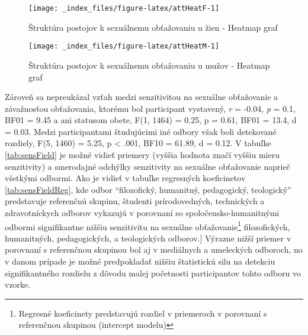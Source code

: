 \documentclass[
]{article}
\begin{document}
\begin{figure}

{\centering \texttt{[image: \_index\_files/figure-latex/attHeatF-1]} 

}

\caption{Štruktúra postojov k sexuálnemu obťažovaniu u žien - Heatmap graf}\label{fig:attHeatF}
\end{figure}

\begin{figure}

{\centering \texttt{[image: \_index\_files/figure-latex/attHeatM-1]} 

}

\caption{Štruktúra postojov k sexuálnemu obťažovaniu u mužov - Heatmap graf}\label{fig:attHeatM}
\end{figure}

Zároveň sa nepreukázal vzťah medzi senzitivitou na sexuálne obťažovanie a závažnosťou obťažovania, ktorému bol participant vystavený, \emph{r} = -0.04, \emph{p} = 0.1, BF01 = 9.45 a ani statusom obete, F(1, 1464) = 0.25, p = 0.61, BF01 = 13.4, d = 0.03. Medzi participantami študujúcimi iné odbory však boli detekované rozdiely, F(5, 1460) = 5.25, p \textless{} .001, BF10 = 61.89, d = 0.12. V tabuľke \ref{tab:sensField} je možné vidieť priemery (vyššia hodnota značí vyššiu mieru senzitivity) a smerodajné odchýlky senzitivity na sexuálne obťažovanie naprieč všetkými odbormi. Ako je vidieť v tabuľke regresných koeficinetov \ref{tab:sensFieldReg}, kde odbor ``filozofický, humanitný, pedagogický, teologický'' predstavuje referenčnú skupinu, študenti prírodovedných, technických a zdravotníckych odborov vykazujú v porovnaní so spoločensko-humanitnými odbormi signifikantne nižšiu senzitivitu na sexuálne obťažovanie\footnote{Regresné koeficinety predstavujú rozdiel v priemeroch v porovnaní s referenčnou skupinou (intercept modelu)} filozofických, humanitných, pedagogických, a teologických odborov.{]} Výrazne nižší priemer v porovnaní s referenčnou skupinou bol aj v mediálnych a umeleckých odboroch, no v danom prípade je možné predpokladať nižšiu štatistickú silu na detekciu signifikantného rozdielu z dôvodu malej početnosti participantov tohto odboru vo vzorke.
\end{document}
